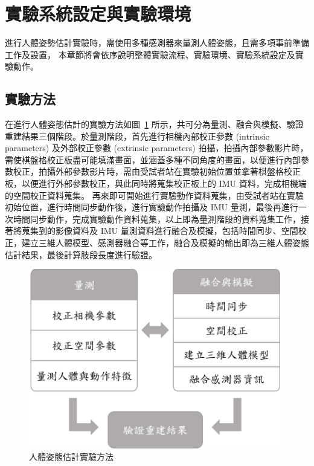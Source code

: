 \section{實驗系統設定與實驗環境}\label{ch3_exp_setting}
進行人體姿勢估計實驗時，需使用多種感測器來量測人體姿態，且需多項事前準備工作及設置，
本章節將會依序說明整體實驗流程、實驗環境、實驗系統設定及實驗動作。

\subsection{實驗方法}
在進行人體姿態估計的實驗方法如圖~\ref{ch3_fig_exp_flow} 所示，共可分為量測、融合與模擬、驗證重建結果三個階段。於量測階段，首先進行相機內部校正參數 (intrinsic parameters) 及外部校正參數 (extrinsic parameters) 拍攝，拍攝內部參數影片時，需使棋盤格校正板盡可能填滿畫面，並涵蓋多種不同角度的畫面，以便進行內部參數校正，拍攝外部參數影片時，需由受試者站在實驗初始位置並拿著棋盤格校正板，以便進行外部參數校正，與此同時將蒐集校正板上的 IMU 資料，完成相機端的空間校正資料蒐集。
再來即可開始進行實驗動作資料蒐集，由受試者站在實驗初始位置，進行時間同步動作後，進行實驗動作拍攝及 IMU 量測，最後再進行一次時間同步動作，完成實驗動作資料蒐集，以上即為量測階段的資料蒐集工作，接著將蒐集到的影像資料及 IMU 量測資料進行融合及模擬，包括時間同步、空間校正，建立三維人體模型、感測器融合等工作，融合及模擬的輸出即為三維人體姿態估計結果，最後計算肢段長度進行驗證。

\begin{figure}[!ht]
   \centering
   \includegraphics[width=11cm]{figure/ch3_fig_exp_flow.png}
    \caption[人體姿態估計實驗方法]{人體姿態估計實驗方法}
    \label{ch3_fig_exp_flow}
\end{figure}

